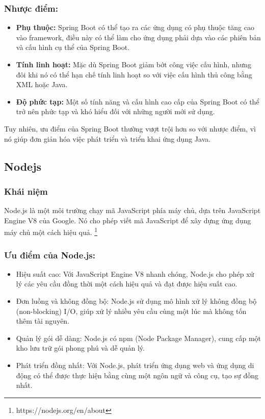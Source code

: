 \subsubsection{Nhược điểm:}
\begin{itemize}
    \item \textbf{Phụ thuộc:} Spring Boot có thể tạo ra các ứng dụng có phụ thuộc tăng cao vào framework, điều này có thể làm cho ứng dụng phải dựa vào các phiên bản và cấu hình cụ thể của Spring Boot.
    \item \textbf{Tính linh hoạt:} Mặc dù Spring Boot giảm bớt công việc cấu hình, nhưng đôi khi nó có thể hạn chế tính linh hoạt so với việc cấu hình thủ công bằng XML hoặc Java.
    \item \textbf{Độ phức tạp:} Một số tính năng và cấu hình cao cấp của Spring Boot có thể trở nên phức tạp và khó hiểu đối với những người mới sử dụng.
\end{itemize}
\indent Tuy nhiên, ưu điểm của Spring Boot thường vượt trội hơn so với nhược điểm, vì nó giúp đơn giản hóa việc phát triển và triển khai ứng dụng Java.

\subsection{Nodejs}
\subsubsection{Khái niệm}
\indent Node.js là một môi trường chạy mã JavaScript phía máy chủ, dựa trên JavaScript Engine V8 của Google. Nó cho phép viết mã JavaScript để xây dựng ứng dụng máy chủ một cách hiệu quả. \footnote{https://nodejs.org/en/about}
\subsubsection{Ưu điểm của Node.js:}
\begin{itemize}
    \item Hiệu suất cao: Với JavaScript Engine V8 nhanh chóng, Node.js cho phép xử lý các yêu cầu đồng thời một cách hiệu quả và đạt được hiệu suất cao.
    \item Đơn luồng và không đồng bộ: Node.js sử dụng mô hình xử lý không đồng bộ (non-blocking) I/O, giúp xử lý nhiều yêu cầu cùng một lúc mà không tốn thêm tài nguyên.
    \item Quản lý gói dễ dàng: Node.js có npm (Node Package Manager), cung cấp một kho lưu trữ gói phong phú và dễ quản lý.
    \item Phát triển đồng nhất: Với Node.js, phát triển ứng dụng web và ứng dụng di động có thể được thực hiện bằng cùng một ngôn ngữ và công cụ, tạo sự đồng nhất.
\end{itemize}
